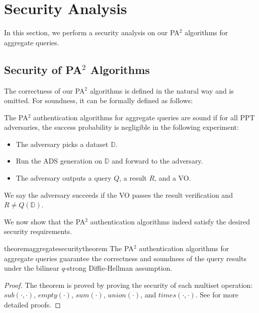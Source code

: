 \section{Security Analysis}\label{sec:aggregate-queries:security-analysis}

In this section, we perform a security analysis on our PA$^2$ algorithms for aggregate queries.

\subsection{Security of PA$^2$ Algorithms}

The correctness of our PA$^2$ algorithms is defined in the natural way and is omitted. For soundness, it can be formally defined as follows:

\begin{definition}[Soundness]\label{def:aggregate-queries:sound}
  The PA$^2$ authentication algorithms for aggregate queries are sound if for all PPT adversaries, the success probability is negligible in the following experiment:
  \begin{itemize}
    \item The adversary picks a dataset $\mathbb{D}$.
    \item Run the ADS generation on $\mathbb{D}$ and forward to the adversary.
    \item The adversary outputs a query $Q$, a result $R$, and a VO\@.
  \end{itemize}
  We say the adversary succeeds if the VO passes the result verification and $ R \neq Q(\mathbb{D})$.
\end{definition}

We now show that the PA$^2$ authentication algorithms indeed satisfy the desired security requirements.

\begin{restatable}{theorem}{aggregatesecuritytheorem}\label{thm:aggregate-queries:sec}
  The PA$^2$ authentication algorithms for aggregate queries guarantee the correctness and soundness of the query results under the bilinear $q$-strong Diffie-Hellman assumption.
\end{restatable}

\begin{proof}
  The theorem is proved by proving the security of each multiset operation: $sub(\cdot,\cdot)$, $empty(\cdot)$, $sum(\cdot)$, $union(\cdot)$, and $times(\cdot,\cdot)$. See  for more detailed proofs.
\end{proof}

